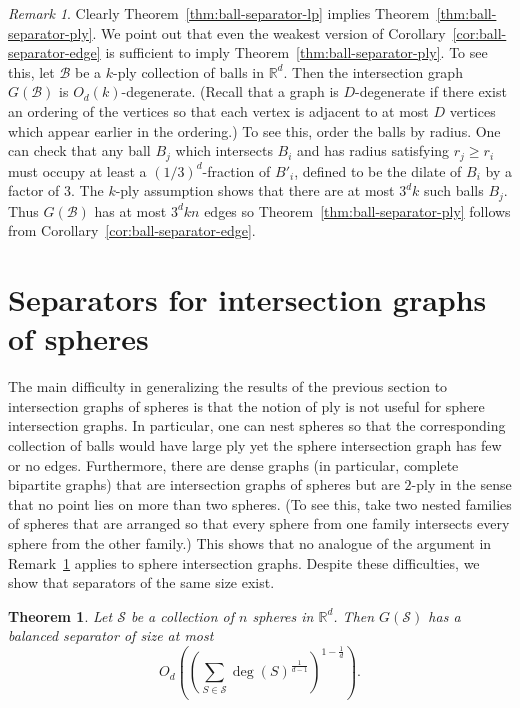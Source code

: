 \documentclass[11pt, reqno]{amsart}
\theoremstyle{plain}
\newtheorem{theorem}{Theorem}
\theoremstyle{definition}
\theoremstyle{remark}
\newtheorem*{remark}{Remark}
\numberwithin{theorem}{section}
\numberwithin{equation}{section}
\newcommand{\paren}[1]{\left( #1 \right)}
\newcommand{\R}{\mathbb R}
\newcommand{\fB}{\mathcal B}
\newcommand{\fS}{\mathcal S}
\begin{document}
\begin{remark}
\label{rem:degeneracy}
Clearly Theorem~\ref{thm:ball-separator-lp} implies Theorem~\ref{thm:ball-separator-ply}. We point out that even the weakest version of Corollary~\ref{cor:ball-separator-edge} is sufficient to imply Theorem~\ref{thm:ball-separator-ply}. To see this, let $\fB$ be a $k$-ply collection of balls in $\R^d$. Then the intersection graph $G(\fB)$ is $O_d(k)$-degenerate. (Recall that a graph is $D$-degenerate if there exist an ordering of the vertices so that each vertex is adjacent to at most $D$ vertices which appear earlier in the ordering.) To see this, order the balls by radius. One can check that any ball $B_j$ which intersects $B_i$ and has radius satisfying $r_j\geq r_i$ must occupy at least a $(1/3)^d$-fraction of $B'_i$, defined to be the dilate of $B_i$ by a factor of 3. The $k$-ply assumption shows that there are at most $3^dk$ such balls $B_j$. Thus $G(\fB)$ has at most $3^dkn$ edges so Theorem~\ref{thm:ball-separator-ply} follows from Corollary~\ref{cor:ball-separator-edge}.
\end{remark}

\section{Separators for intersection graphs of spheres}

The main difficulty in generalizing the results of the previous section to intersection graphs of spheres is that the notion of ply is not useful for sphere intersection graphs. In particular, one can nest spheres so that the corresponding collection of balls would have large ply yet the sphere intersection graph has few or no edges. Furthermore, there are dense graphs (in particular, complete bipartite graphs) that are intersection graphs of spheres but are $2$-ply in the sense that no point lies on more than two spheres. (To see this, take two nested families of spheres that are arranged so that every sphere from one family intersects every sphere from the other family.) This shows that no analogue of the argument in Remark~\ref{rem:degeneracy} applies to sphere intersection graphs. Despite these difficulties, we show that separators of the same size exist.

\begin{theorem}
\label{thm:sphere-separator-main}
Let $\fS$ be a collection of $n$ spheres in $\R^d$. Then $G(\fS)$ has a balanced separator of size at most
\[O_d\paren{\paren{\sum_{S\in\fS}\deg(S)^{\tfrac1{d-1}}}^{1-\tfrac1d}}.\]
\end{theorem}
\end{document}
